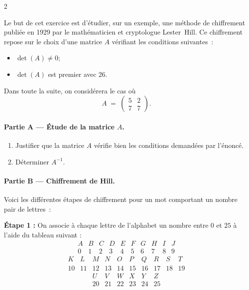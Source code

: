 \documentclass[a4paper,12pt]{article}
\begin{document}
\begin{multicols}{2}
\newpage

\begin{exercice}[title=Exercice 18 $\star\star\star$ { [Modéliser, Calculer, Chercher] }]{}{}
  Le but de cet exercice est d’étudier, sur un exemple, une méthode de chiffrement publiée en 1929 par le mathématicien et cryptologue Lester~Hill. Ce chiffrement repose sur le choix d’une matrice $A$ vérifiant les conditions suivantes :
  \begin{itemize}
    \item $\det(A) \neq 0$;
    \item $\det(A)$ est premier avec 26.
  \end{itemize}

  Dans toute la suite, on considérera le cas où
  \[
    A \;=\;
    \begin{pmatrix}
      5 & 2 \\[5pt]
      7 & 7
    \end{pmatrix}.
  \]

  \paragraph{Partie A — Étude de la matrice $A$.}
  \begin{enumerate}
    \item Justifier que la matrice $A$ vérifie bien les conditions demandées par l’énoncé.
    \item Déterminer $A^{-1}$.
  \end{enumerate}

  \paragraph{Partie B — Chiffrement de Hill.}
  Voici les différentes étapes de chiffrement pour un mot comportant un nombre pair de lettres :

  \textbf{Étape 1 :} On associe à chaque lettre de l’alphabet un nombre entre $0$ et $25$ à l’aide du tableau suivant :
  \[
    \begin{array}{cccccccccc}
      A & B & C & D & E & F & G & H & I & J \\
      \hline
      0 & 1 & 2 & 3 & 4 & 5 & 6 & 7 & 8 & 9
    \end{array}
  \]
  \[
    \begin{array}{cccccccccc}
      K & L & M & N & O & P & Q & R & S & T \\
      \hline
      10 & 11 & 12 & 13 & 14 & 15 & 16 & 17 & 18 & 19
    \end{array}
  \]
  \[
    \begin{array}{cccccc}
      U & V & W & X & Y & Z \\
      \hline
      20 & 21 & 22 & 23 & 24 & 25
    \end{array}
  \]


\end{exercice}
\end{multicols}
\end{document}
